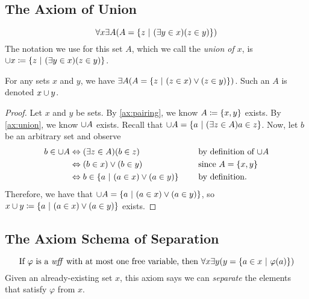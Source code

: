 \subsection{The Axiom of Union}
\begin{axiom}[Union]\label{ax:union}
    \vspace{-\abovedisplayskip}
    \[
        \forall x \exists A \pn*{A = \set*{z \suchthat \pn*{\exists y \in x}\pn*{z \in y}}}
    \]
    The notation we use for this set \(A\), which we call the \emph{union of \(x\)},
    is \(\union x \defn \set*{z \suchthat \pn*{\exists y \in x}\pn*{z \in y}}\).
\end{axiom}

\begin{theorem}\label{thm:union}
    For any sets \(x\) and \(y\),
    we have \(\exists A \pn*{A = \set*{z \suchthat \pn*{z \in x} \join \pn*{z \in y}}}\).
    Such an \(A\) is denoted \(x \cup y\).
\end{theorem}
\begin{proof}
    Let \(x\) and \(y\) be sets.
    By \autoref{ax:pairing}, we know \(A \defn \set*{x, y}\) exists.
    By \autoref{ax:union}, we know \(\cup A\) exists.
    Recall that \(\union A = \set*{a \suchthat \pn*{\exists z \in A}{a \in z}}\).
    Now, let \(b\) be an arbitrary set and observe
    \begin{alignat*}{2}
        b \in \union A &\iff \pn*{\exists z \in A}\pn*{b \in z} &&\text{by definition of \(\union A\)} \\
                       &\iff (b \in x) \join (b \in y) &&\text{since \(A = \set*{x, y}\)} \\
                       &\iff b \in \set*{a \suchthat (a \in x) \join (a \in y)}~~~~&&\text{by definition}.
    \end{alignat*}
    Therefore, we have that \(\union A = \set*{a \suchthat (a \in x) \join (a \in y)}\),
    so \(x \union y \defn \set*{a \suchthat (a \in x) \join (a \in y)}\) exists.
\end{proof}

\subsection{The Axiom Schema of Separation}
\begin{axiom}[Separation]\label{ax:separation}
    \vspace{-\abovedisplayskip}
    \[
        \text{If \(\varphi\) is a {\wff} with at most one free variable, then }
        \forall x \exists y \pn*{y = \set*{a \in x \suchthat \varphi(a)}}
    \]
    Given an already-existing set \(x\),
    this axiom says we can \emph{separate} the elements that satisfy \(\varphi\) from \(x\).
\end{axiom}

